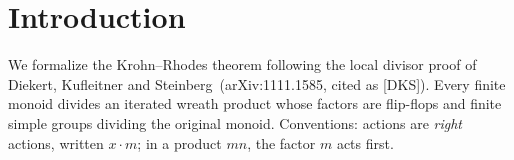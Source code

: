 \chapter*{Introduction}

We formalize the Krohn--Rhodes theorem following the local divisor proof of
Diekert, Kufleitner and Steinberg~(arXiv:1111.1585, cited as [DKS]).
Every finite monoid divides an iterated wreath product whose factors are
flip-flops and finite simple groups dividing the original monoid.
Conventions: actions are \emph{right} actions, written $x \cdot m$; in a
product $mn$, the factor $m$ acts first.












